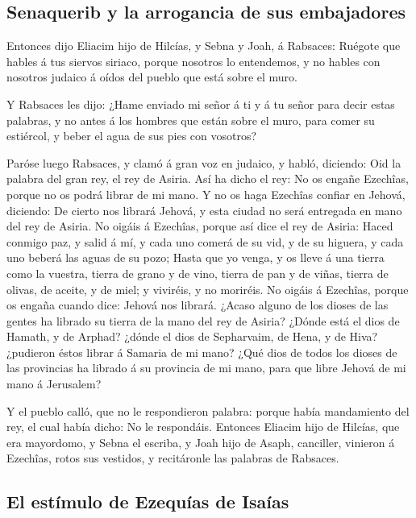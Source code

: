 \hypertarget{senaquerib-y-la-arrogancia-de-sus-embajadores}{%
\subsection{Senaquerib y la arrogancia de sus
embajadores}\label{senaquerib-y-la-arrogancia-de-sus-embajadores}}

 Entonces dijo Eliacim hijo de Hilcías, y Sebna y Joah, á
Rabsaces: Ruégote que hables á tus siervos siriaco, porque nosotros lo
entendemos, y no hables con nosotros judaico á oídos del pueblo que está
sobre el muro.

 Y Rabsaces les dijo: ¿Hame enviado mi señor á ti y á tu
señor para decir estas palabras, y no antes á los hombres que están
sobre el muro, para comer su estiércol, y beber el agua de sus pies con
vosotros?

 Paróse luego Rabsaces, y clamó á gran voz en judaico, y
habló, diciendo: Oid la palabra del gran rey, el rey de Asiria.
 Así ha dicho el rey: No os engañe Ezechîas, porque no os
podrá librar de mi mano.  Y no os haga Ezechîas confiar en
Jehová, diciendo: De cierto nos librará Jehová, y esta ciudad no será
entregada en mano del rey de Asiria.  No oigáis á Ezechîas,
porque así dice el rey de Asiria: Haced conmigo paz, y salid á mí, y
cada uno comerá de su vid, y de su higuera, y cada uno beberá las aguas
de su pozo;  Hasta que yo venga, y os lleve á una tierra
como la vuestra, tierra de grano y de vino, tierra de pan y de viñas,
tierra de olivas, de aceite, y de miel; y viviréis, y no moriréis. No
oigáis á Ezechîas, porque os engaña cuando dice: Jehová nos librará.
 ¿Acaso alguno de los dioses de las gentes ha librado su
tierra de la mano del rey de Asiria?  ¿Dónde está el dios
de Hamath, y de Arphad? ¿dónde el dios de Sepharvaim, de Hena, y de
Hiva? ¿pudieron éstos librar á Samaria de mi mano?  ¿Qué
dios de todos los dioses de las provincias ha librado á su provincia de
mi mano, para que libre Jehová de mi mano á Jerusalem?

 Y el pueblo calló, que no le respondieron palabra: porque
había mandamiento del rey, el cual había dicho: No le respondáis.
 Entonces Eliacim hijo de Hilcías, que era mayordomo, y
Sebna el escriba, y Joah hijo de Asaph, canciller, vinieron á Ezechîas,
rotos sus vestidos, y recitáronle las palabras de Rabsaces.

\hypertarget{el-estuxedmulo-de-ezequuxedas-de-isauxedas}{%
\subsection{El estímulo de Ezequías de
Isaías}\label{el-estuxedmulo-de-ezequuxedas-de-isauxedas}}

